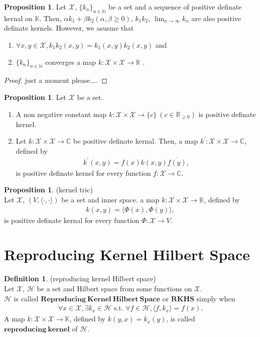 \documentclass[11pt, a4paper, english, dvipdfmx]{jsarticle}
\theoremstyle{definition}
\newtheorem{Definition+}[Axiom+]{Definition}
\newtheorem{Proposition+}[Axiom+]{Proposition}
\def\hoge<#1>{\langle #1 \rangle}
\newcommand{\N}{\mathbb{N}}
\newcommand{\R}{\mathbb{R}}
\newcommand{\C}{\mathbb{C}}
\newcommand{\K}{\mathbb{K}}
\newcommand{\X}{\mathcal{X}}
\newcommand{\Hil}{\mathcal{H}}
\newcommand{\dip}{\displaystyle}
\begin{document}
\begin{Proposition+}
    Let $\X$, $\{k_{n}\}_{n\in\N}$ be a set and a sequence of positive definate kernal on $\K$.
    Then, $\alpha k_{1} + \beta k_{2}(\alpha, \beta \geq 0)$, $k_{1}k_{2}$, $\dip \lim_{n\to\infty}k_{n}$ are also positive definate kernels.
    However, we asusme that 
    \begin{enumerate}
        \item $\forall x, y\in\X, k_{1}k_{2}(x, y) = k_{1}(x, y)k_{2}(x, y)$ and
        \item $\{k_{n}\}_{n\in\N}$ converges a map $k:\X\times\X\to\K$ .
    \end{enumerate}
    \begin{proof}
        just a moment please....
    \end{proof}
\end{Proposition+}

\begin{Proposition+}
    Let $\X$ be a set.
    \begin{enumerate}
        \item A non negative constant map $k:\X\times\X\to\{c\}~(c\in\R_{\geq 0})$ is positive definate kernel.
        \item Let $k:\X\times\X\to\C$ be positive definate kernal. Then, a map $k^{'}:\X\times\X\to\C$, defined by 
        \begin{align*}
            k^{'}(x, y) = f(x)k(x, y)\overline{f(y)},
        \end{align*} 
        is positive definate kernel for every function $f:\X\to\C$.
    \end{enumerate}
\end{Proposition+}

\begin{Proposition+}(kernel tric)\\
    Let $\X$, $(V, \hoge<\cdot, \cdot>)$ be a set and inner space. a map $k:\X\times\X\to\K$, defined by 
    \begin{align*}
        k(x, y) = \hoge<\Phi(x), \Phi(y)>,
    \end{align*}
    is positive definate kernal for every function $\Phi:\X\to V$.
\end{Proposition+}
\section{Reproducing Kernel Hilbert Space}
\begin{Definition+}(reproducing kernel Hilbert space)\\
    Let $\X$, $\Hil$ be a set and Hilbert space from some functions on $\X$.\\
    $\Hil$ is called $\mathbf{Reproducing~Kernel~Hilbert~Space}$ or $\mathbf{RKHS}$ simply when
    \begin{align*}
        \forall x\in\X, \exists k_{x}\in\Hil\text{ s.t. }\forall f\in\Hil, \hoge<f, k_{x}> = f(x).
    \end{align*} 
    A map $k:\X\times\X\to\K$, defined by $k(y, x) = k_{x}(y)$, is called $\mathbf{reproducing~kernel}$ of $\Hil$. 
\end{Definition+}
\end{document}
